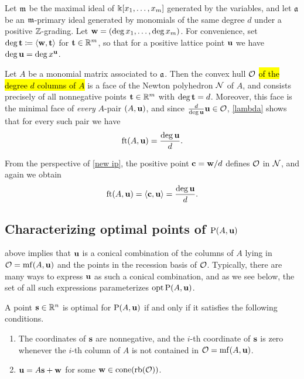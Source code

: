 \documentclass{amsart}
\begin{document}
\begin{example}
   \label{ex: m-primary homogeneous case}
   Let $\mathfrak{m}$ be the maximal ideal of  $\Bbbk[x_1,\ldots,x_m]$ generated by the variables, and let $\mathfrak{a}$ be an $\mathfrak{m}$-primary ideal generated by monomials of the same degree $d$ under a positive $\mathbb{Z}$-grading.
   Let $\mathbf{w} = (\deg x_1,\ldots,\deg x_m)$.
   For convenience, set $\deg \mathbf{t} \coloneqq \langle \mathbf{w}, \mathbf{t} \rangle$ for $\mathbf{t} \in \mathbb{R}^m$, so that for a positive lattice point $\mathbf{u}$ we have $\deg \mathbf{u} = \deg x^{\mathbf{u}}$.

   Let $A$ be a monomial matrix associated to $\mathfrak{a}$.
   Then the convex hull $\mathcal{O}$ \hl{of the degree $d$ columns of $A$}
   is a face of the Newton polyhedron $\mathcal{N}$ of $A$, and consists precisely of all nonnegative points $\mathbf{t} \in \mathbb{R}^m$ with $\deg \mathbf{t}  = d$.
   Moreover, this face is the minimal face of \emph{every} $A$-pair $(A,\mathbf{u})$, and since $\frac d{\deg \mathbf{u}}\mathbf{u} \in \mathcal{O}$, \ref{lambda} shows that for every such pair we have
   \[
      \operatorname{ft}(A, \mathbf{u}) = \frac{\deg \mathbf{u}}{d}.
   \]

   From the perspective of \ref{new ip}, the positive point $\mathbf{c} = \mathbf{w}/d$ defines $\mathcal{O}$ in $\mathcal{N}$, and again we obtain
   \[
      \operatorname{ft}(A, \mathbf{u}) = \langle \mathbf{c}, \mathbf{u} \rangle = \frac{\deg \mathbf{u}}{d}.
   \]
\end{example}

\subsection{Characterizing optimal points of $\mathrm{P}(A,\mathbf{u})$}

 above implies that $\mathbf{u}$ is a conical combination of the columns of $A$ lying in $\mathcal{O} = \operatorname{mf}(A,\mathbf{u})$ and the points in the recession basis of $\mathcal{O}$.
Typically, there are many ways to express $\mathbf{u}$ as such a conical combination, and as we see below, the set of all such expressions parameterizes  $\operatorname{opt} \mathrm{P}(A, \mathbf{u})$.

\begin{proposition}\label{opt set: P}
   A point $\mathbf{s} \in \mathbb{R}^n$ is optimal for $\mathrm{P}(A, \mathbf{u})$ if and only if it satisfies the following conditions.
\begin{enumerate}[$(1)$]
\item  \label{mc coords: e} The coordinates of $\mathbf{s}$ are nonnegative, and the $i$-th coordinate of $\mathbf{s}$ is zero whenever the $i$-th column of $A$ is not contained in $\mathcal{O} = \operatorname{mf}(A, \mathbf{u})$.
\item  \label{mc decomposition: e} $\mathbf{u} = A \mathbf{s} + \mathbf{w}$ for some $\mathbf{w} \in  \operatorname{cone}(\operatorname{rb}(\mathcal{O}))$.
\end{enumerate}
\end{proposition}
\end{document}
